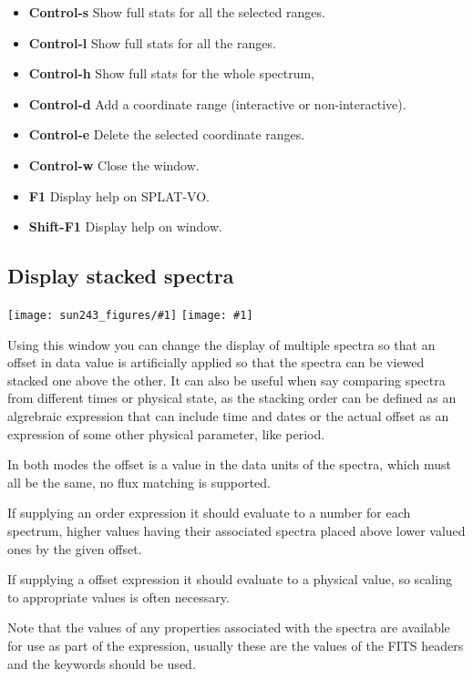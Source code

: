 \documentclass[twoside,11pt,nolof]{starlink}
\providecommand{\SPLAT}{\textsf{SPLAT-VO}}
\providecommand{\mainfigure}[1]
{\begin{center}
    \ifpdf
    \texttt{[image: sun243\_figures/\#1]}
    \else
    \texttt{[image: \#1]}
    \fi
 \end{center}
}
\newcommand{\labelitem}[1]{\textbf{#1}}
\begin{document}
\begin{itemize}
\item \labelitem{Control-s} Show full stats for all the selected ranges.
\item \labelitem{Control-l} Show full stats for all the ranges.
\item \labelitem{Control-h} Show full stats for the whole spectrum,

\item \labelitem{Control-d} Add a coordinate range (interactive or non-interactive).
\item \labelitem{Control-e} Delete the selected coordinate ranges.

\item \labelitem{Control-w} Close the window.
\item \labelitem{F1} Display help on \SPLAT.
\item \labelitem{Shift-F1} Display help on window.
\end{itemize}

\newpage
\subsection{Display stacked spectra}

\mainfigure{stackerwindow}

Using this window you can change the display of multiple spectra so that an
offset in data value is artificially applied so that the spectra can be viewed
stacked one above the other. It can also be useful when say comparing spectra
from different times or physical state, as the stacking order can be defined
as an algrebraic expression that can include time and dates or the actual
offset as an expression of some other physical parameter, like period.

In both modes the offset is a value in the data units of the spectra, which
must all be the same, no flux matching is supported.

If supplying an order expression it should evaluate to a number for each
spectrum, higher values having their associated spectra placed above lower
valued ones by the given offset.

If supplying a offset expression it should evaluate to a physical value, so
scaling to appropriate values is often necessary.

Note that the values of any properties associated with the spectra are
available for use as part of the expression, usually these are the values of
the FITS headers and the keywords should be used.
\end{document}
